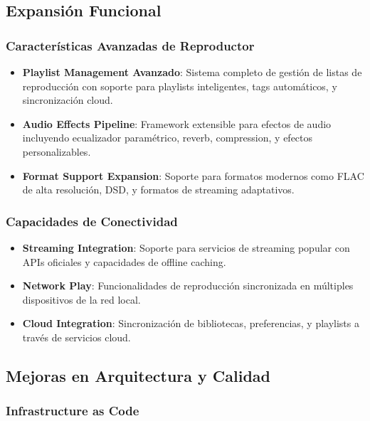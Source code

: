 \documentclass[a4paper]{article}
\begin{document}
\subsection{Expansión Funcional}

\subsubsection{Características Avanzadas de Reproductor}

\begin{itemize}
\item \textbf{Playlist Management Avanzado}: Sistema completo de gestión de listas de reproducción con soporte para playlists inteligentes, tags automáticos, y sincronización cloud.

\item \textbf{Audio Effects Pipeline}: Framework extensible para efectos de audio incluyendo ecualizador paramétrico, reverb, compression, y efectos personalizables.

\item \textbf{Format Support Expansion}: Soporte para formatos modernos como FLAC de alta resolución, DSD, y formatos de streaming adaptativos.
\end{itemize}

\subsubsection{Capacidades de Conectividad}

\begin{itemize}
\item \textbf{Streaming Integration}: Soporte para servicios de streaming popular con APIs oficiales y capacidades de offline caching.

\item \textbf{Network Play}: Funcionalidades de reproducción sincronizada en múltiples dispositivos de la red local.

\item \textbf{Cloud Integration}: Sincronización de bibliotecas, preferencias, y playlists a través de servicios cloud.
\end{itemize}

\subsection{Mejoras en Arquitectura y Calidad}

\subsubsection{Infrastructure as Code}
\end{document}
